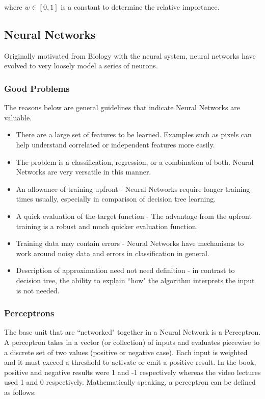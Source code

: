 \documentclass[titlepage,11pt]{article}
\begin{document}
where $w \in [0, 1]$ is a constant to determine the relative importance.

\subsection{Neural Networks}

Originally motivated from Biology with the neural system, neural networks have evolved to very loosely model a series of neurons.

\subsubsection{Good Problems}

The reasons below are general guidelines that indicate Neural Networks are valuable. 

\begin{itemize}
\item There are a large set of features to be learned. Examples such as pixels can help understand correlated or independent features more easily.
\item The problem is a classification, regression, or a combination of both. Neural Networks are very versatile in this manner.
\item An allowance of training upfront - Neural Networks require longer training times usually, especially in comparison of decision tree learning.
\item A quick evaluation of the target function - The advantage from the upfront training is a robust and much quicker evaluation function.
\item Training data may contain errors - Neural Networks have mechanisms to work around noisy data and errors in classification in general.
\item Description of approximation need not need definition - in contrast to decision tree, the ability to explain ``how" the algorithm interprets the input is not needed.
\end{itemize}

\subsubsection{Perceptrons}

The base unit that are ``networked" together in a Neural Network is a Perceptron. A perceptron takes in a vector (or collection) of inputs and evaluates piecewise to a discrete set of two values (positive or negative case). Each input is weighted and it must exceed a threshold to activate or emit a positive result. In the book, positive and negative results were 1 and -1 respectively whereas the video lectures used 1 and 0 respectively. Mathematically speaking, a perceptron can be defined as follows:
\end{document}
